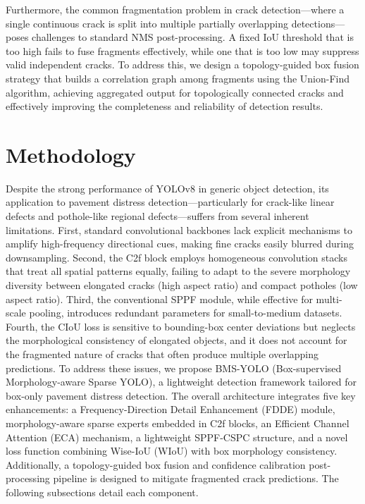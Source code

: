 \documentclass[twocolumn]{sn-jnl}
\begin{document}
	Furthermore, the common fragmentation problem in crack detection---where a single continuous crack is split into multiple partially overlapping detections---poses challenges to standard NMS post-processing. A fixed IoU threshold that is too high fails to fuse fragments effectively, while one that is too low may suppress valid independent cracks. To address this, we design a topology-guided box fusion strategy that builds a correlation graph among fragments using the Union-Find algorithm, achieving aggregated output for topologically connected cracks and effectively improving the completeness and reliability of detection results.
	
	\section{Methodology}
	Despite the strong performance of YOLOv8 in generic object detection, its application to pavement distress detection---particularly for crack-like linear defects and pothole-like regional defects---suffers from several inherent limitations. First, standard convolutional backbones lack explicit mechanisms to amplify high-frequency directional cues, making fine cracks easily blurred during downsampling. Second, the C2f block employs homogeneous convolution stacks that treat all spatial patterns equally, failing to adapt to the severe morphology diversity between elongated cracks (high aspect ratio) and compact potholes (low aspect ratio). Third, the conventional SPPF module, while effective for multi-scale pooling, introduces redundant parameters for small-to-medium datasets. Fourth, the CIoU loss is sensitive to bounding-box center deviations but neglects the morphological consistency of elongated objects, and it does not account for the fragmented nature of cracks that often produce multiple overlapping predictions. To address these issues, we propose BMS-YOLO (Box-supervised Morphology-aware Sparse YOLO), a lightweight detection framework tailored for box-only pavement distress detection. The overall architecture integrates five key enhancements: a Frequency-Direction Detail Enhancement (FDDE) module, morphology-aware sparse experts embedded in C2f blocks, an Efficient Channel Attention (ECA) mechanism, a lightweight SPPF-CSPC structure, and a novel loss function combining Wise-IoU (WIoU) with box morphology consistency. Additionally, a topology-guided box fusion and confidence calibration post-processing pipeline is designed to mitigate fragmented crack predictions. The following subsections detail each component.
	
\end{document}
